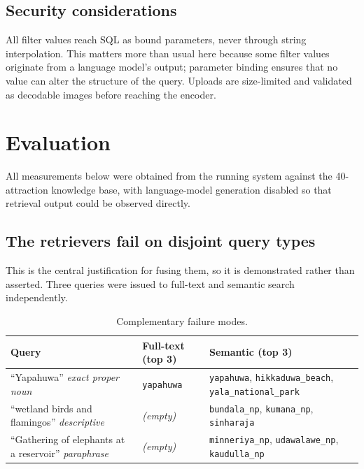 \documentclass[11pt,a4paper]{article}
\begin{document}
\subsection{Security considerations}

All filter values reach SQL as bound parameters, never through string
interpolation. This matters more than usual here because some filter values
originate from a language model's output; parameter binding ensures that no
value can alter the structure of the query. Uploads are size-limited and
validated as decodable images before reaching the encoder.

\section{Evaluation}

All measurements below were obtained from the running system against the
40-attraction knowledge base, with language-model generation disabled so that
retrieval output could be observed directly.

\subsection{The retrievers fail on disjoint query types}

This is the central justification for fusing them, so it is demonstrated rather
than asserted. Three queries were issued to full-text and semantic search
independently.

\begin{table}[h]
\centering
\small
\begin{tabular}{p{4.1cm}p{4.3cm}p{5.4cm}}
\toprule
\textbf{Query} & \textbf{Full-text (top 3)} & \textbf{Semantic (top 3)} \\
\midrule
``Yapahuwa'' \newline \emph{exact proper noun}
  & \texttt{yapahuwa}
  & \texttt{yapahuwa}, \texttt{hikkaduwa\_beach}, \texttt{yala\_national\_park} \\
\addlinespace
``wetland birds and flamingos'' \newline \emph{descriptive}
  & \emph{(empty)}
  & \texttt{bundala\_np}, \texttt{kumana\_np}, \texttt{sinharaja} \\
\addlinespace
``Gathering of elephants at a reservoir'' \newline \emph{paraphrase}
  & \emph{(empty)}
  & \texttt{minneriya\_np}, \texttt{udawalawe\_np}, \texttt{kaudulla\_np} \\
\bottomrule
\end{tabular}
\caption{Complementary failure modes.}
\label{tab:complement}
\end{table}
\end{document}
